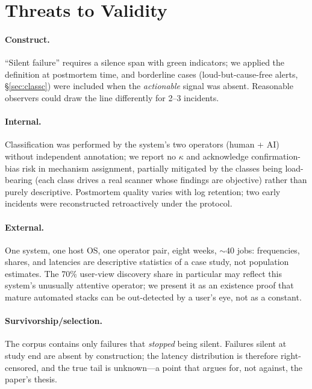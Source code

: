 \section{Threats to Validity}\label{sec:threats}

\paragraph{Construct.} ``Silent failure'' requires a silence span with
green indicators; we applied the definition at postmortem time, and
borderline cases (loud-but-cause-free alerts, \S\ref{sec:classc}) were
included when the \emph{actionable} signal was absent. Reasonable
observers could draw the line differently for 2--3 incidents.

\paragraph{Internal.} Classification was performed by the system's two
operators (human + AI) without independent annotation; we report no
$\kappa$ and acknowledge confirmation-bias risk in mechanism assignment,
partially mitigated by the classes being load-bearing (each class drives
a real scanner whose findings are objective) rather than purely
descriptive. Postmortem quality varies with log retention; two early
incidents were reconstructed retroactively under the protocol.

\paragraph{External.} One system, one host OS, one operator pair, eight
weeks, ${\sim}40$ jobs: frequencies, shares, and latencies are
descriptive statistics of a case study, not population estimates. The
70\% user-view discovery share in particular may reflect this system's
unusually attentive operator; we present it as an existence proof that
mature automated stacks can be out-detected by a user's eye, not as a
constant.

\paragraph{Survivorship/selection.} The corpus contains only failures
that \emph{stopped} being silent. Failures silent at study end are absent
by construction; the latency distribution is therefore right-censored,
and the true tail is unknown---a point that argues for, not against, the
paper's thesis.

